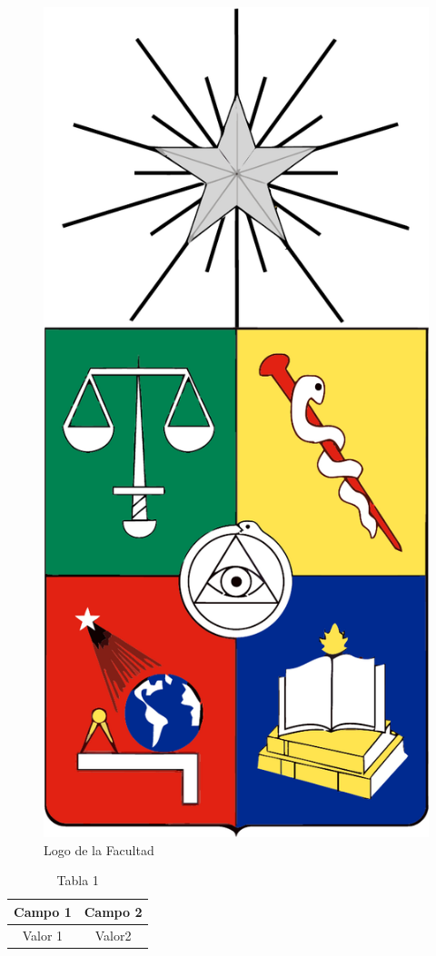 \begin{conclusion}
	\lipsum[130-132]
	\begin{figure}[!h]
		\centering
		\includegraphics[scale=.2]{img/u_logo}
		\caption{Logo de la Facultad}
		\label{logofcfm}
	\end{figure}
	\lipsum[133-134]
	\begin{table}[!h]
		\centering
		\begin{tabular}{|c||c|}
			\hline
			Campo 1& Campo 2\\\hline
			Valor 1& Valor2\\\hline
		\end{tabular}
		\caption{Tabla 1}
		\label{tabla:1}
	\end{table}
	\lipsum[135]
\end{conclusion}